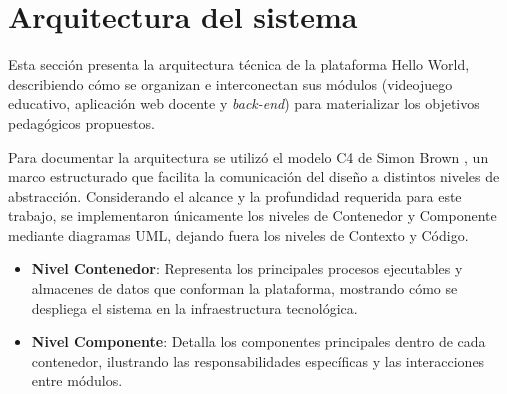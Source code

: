 \section{Arquitectura del sistema}

%
%

Esta sección presenta la arquitectura técnica de la plataforma Hello World, describiendo cómo se organizan e interconectan sus módulos (videojuego educativo, aplicación web docente y \textit{back-end}) para materializar los objetivos pedagógicos propuestos.

Para documentar la arquitectura se utilizó el modelo C4 de Simon Brown \cite{brown2018c4}, un marco estructurado que facilita la comunicación del diseño a distintos niveles de abstracción. Considerando el alcance y la profundidad requerida para este trabajo, se implementaron únicamente los niveles de Contenedor y Componente mediante diagramas UML, dejando fuera los niveles de Contexto y Código.

\begin{itemize}
	\item \textbf{Nivel Contenedor}: Representa los principales procesos ejecutables y almacenes de datos que conforman la plataforma, mostrando cómo se despliega el sistema en la infraestructura tecnológica.
	\item \textbf{Nivel Componente}: Detalla los componentes principales dentro de cada contenedor, ilustrando las responsabilidades específicas y las interacciones entre módulos.
\end{itemize}

